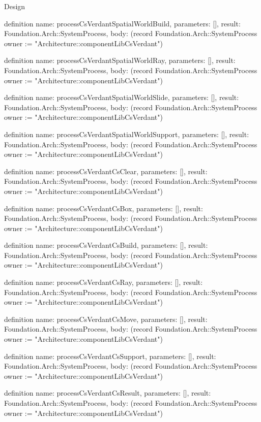 \begin{lexlean}{Design}
\begin{semanticmodule}
definition{
  name: processCsVerdantSpatialWorldBuild,
  parameters: [],
  result: Foundation.Arch::SystemProcess,
  body: (record Foundation.Arch::SystemProcess {owner := "Architecture::componentLibCsVerdant"})
}

definition{
  name: processCsVerdantSpatialWorldRay,
  parameters: [],
  result: Foundation.Arch::SystemProcess,
  body: (record Foundation.Arch::SystemProcess {owner := "Architecture::componentLibCsVerdant"})
}

definition{
  name: processCsVerdantSpatialWorldSlide,
  parameters: [],
  result: Foundation.Arch::SystemProcess,
  body: (record Foundation.Arch::SystemProcess {owner := "Architecture::componentLibCsVerdant"})
}

definition{
  name: processCsVerdantSpatialWorldSupport,
  parameters: [],
  result: Foundation.Arch::SystemProcess,
  body: (record Foundation.Arch::SystemProcess {owner := "Architecture::componentLibCsVerdant"})
}

definition{
  name: processCsVerdantCsClear,
  parameters: [],
  result: Foundation.Arch::SystemProcess,
  body: (record Foundation.Arch::SystemProcess {owner := "Architecture::componentLibCsVerdant"})
}

definition{
  name: processCsVerdantCsBox,
  parameters: [],
  result: Foundation.Arch::SystemProcess,
  body: (record Foundation.Arch::SystemProcess {owner := "Architecture::componentLibCsVerdant"})
}

definition{
  name: processCsVerdantCsBuild,
  parameters: [],
  result: Foundation.Arch::SystemProcess,
  body: (record Foundation.Arch::SystemProcess {owner := "Architecture::componentLibCsVerdant"})
}

definition{
  name: processCsVerdantCsRay,
  parameters: [],
  result: Foundation.Arch::SystemProcess,
  body: (record Foundation.Arch::SystemProcess {owner := "Architecture::componentLibCsVerdant"})
}

definition{
  name: processCsVerdantCsMove,
  parameters: [],
  result: Foundation.Arch::SystemProcess,
  body: (record Foundation.Arch::SystemProcess {owner := "Architecture::componentLibCsVerdant"})
}

definition{
  name: processCsVerdantCsSupport,
  parameters: [],
  result: Foundation.Arch::SystemProcess,
  body: (record Foundation.Arch::SystemProcess {owner := "Architecture::componentLibCsVerdant"})
}

definition{
  name: processCsVerdantCsResult,
  parameters: [],
  result: Foundation.Arch::SystemProcess,
  body: (record Foundation.Arch::SystemProcess {owner := "Architecture::componentLibCsVerdant"})
}


\end{semanticmodule}
\end{lexlean}
